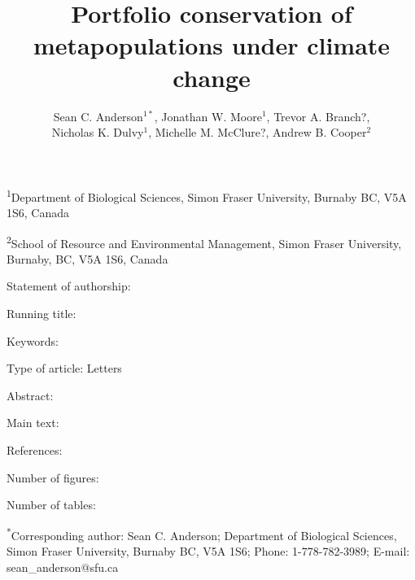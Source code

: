 \documentclass[12pt]{article}
\title{Portfolio conservation of metapopulations under climate change}
\author{
  Sean C. Anderson$^{1*}$, 
  Jonathan W. Moore$^1$,
  Trevor A. Branch?,\\
  Nicholas K. Dulvy$^1$,
  Michelle M. McClure?,
  Andrew B. Cooper$^2$
}
\date{}
\begin{document}
\linenumbers
\modulolinenumbers[2]
\begin{spacing}{1.3}
\maketitle

\noindent
  \textsuperscript{1}Department of Biological Sciences, Simon Fraser
  University, Burnaby BC, V5A 1S6, Canada

\noindent
	\textsuperscript{2}School of Resource and Environmental Management, Simon
  Fraser University, Burnaby, BC, V5A 1S6, Canada


\noindent
Statement of authorship: 

\noindent
Running title: 

\noindent
Keywords:

\noindent
Type of article: Letters

\noindent
Abstract:

\noindent
Main text:

\noindent
References:

\noindent
Number of figures:

\noindent
Number of tables:

\noindent
	\textsuperscript{*}Corresponding author: Sean C. Anderson; Department of Biological Sciences, Simon Fraser University, Burnaby BC, V5A 1S6; Phone: 1-778-782-3989; E-mail: sean\_anderson@sfu.ca

\clearpage



\renewcommand{\thetable}{S\arabic{table}}
\setcounter{table}{0} %

\renewcommand{\thefigure}{S\arabic{figure}}
\renewcommand{\figurename}{Fig.}
\setcounter{figure}{0}  %



\end{spacing}
\end{document}
